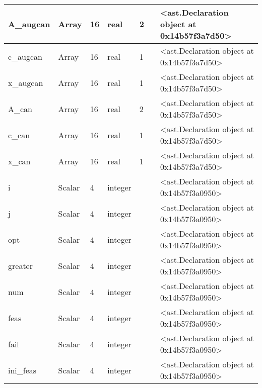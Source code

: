 \documentclass{report}
\begin{document}
\begin{center}
\begin{longtable}{|p{3.5cm}|p{1.5cm}|p{1.5cm}|p{1.5cm}|p{1cm}|p{2cm}|p{4cm}| }
A\_augcan & Array & 16 & real & 2 &  & <ast.Declaration object at 0x14b57f3a7d50> \\\hline

c\_augcan & Array & 16 & real & 1 &  & <ast.Declaration object at 0x14b57f3a7d50> \\\hline

x\_augcan & Array & 16 & real & 1 &  & <ast.Declaration object at 0x14b57f3a7d50> \\\hline

A\_can & Array & 16 & real & 2 &  & <ast.Declaration object at 0x14b57f3a7d50> \\\hline

c\_can & Array & 16 & real & 1 &  & <ast.Declaration object at 0x14b57f3a7d50> \\\hline

x\_can & Array & 16 & real & 1 &  & <ast.Declaration object at 0x14b57f3a7d50> \\\hline

i & Scalar & 4 & integer &  &  & <ast.Declaration object at 0x14b57f3a0950> \\\hline

j & Scalar & 4 & integer &  &  & <ast.Declaration object at 0x14b57f3a0950> \\\hline

opt & Scalar & 4 & integer &  &  & <ast.Declaration object at 0x14b57f3a0950> \\\hline

greater & Scalar & 4 & integer &  &  & <ast.Declaration object at 0x14b57f3a0950> \\\hline

num & Scalar & 4 & integer &  &  & <ast.Declaration object at 0x14b57f3a0950> \\\hline

feas & Scalar & 4 & integer &  &  & <ast.Declaration object at 0x14b57f3a0950> \\\hline

fail & Scalar & 4 & integer &  &  & <ast.Declaration object at 0x14b57f3a0950> \\\hline

ini\_feas & Scalar & 4 & integer &  &  & <ast.Declaration object at 0x14b57f3a0950> \\\hline

\end{longtable}
\end{center}

 \vspace{1cm}
\end{document}
